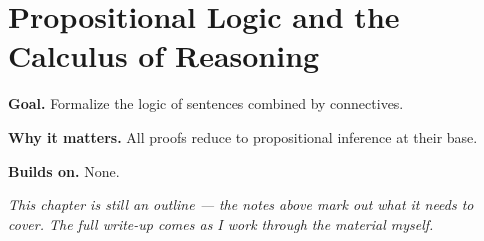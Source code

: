 \chapter{Propositional Logic and the Calculus of Reasoning}
\label{ch:01-mathematical-logic-and-proof-theory-01}

\begin{chapterintro}
\textbf{Goal.} Formalize the logic of sentences combined by connectives.

\textbf{Why it matters.} All proofs reduce to propositional inference at their base.

\textbf{Builds on.} None.
\end{chapterintro}

\textit{This chapter is still an outline --- the notes above mark out what it needs to cover. The full write-up comes as I work through the material myself.}
